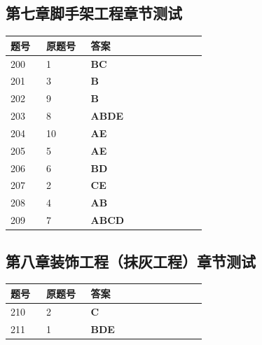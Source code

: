 \documentclass[UTF8,fontset=windows,11pt]{ctexart}
\begin{document}
\subsection*{第七章脚手架工程章节测试}
\begin{longtable}{p{0.16\linewidth}p{0.2\linewidth}p{0.52\linewidth}}
\textbf{\textcolor{examnavy}{题号}} & \textbf{\textcolor{examnavy}{原题号}} & \textbf{\textcolor{answergreen}{答案}} \\
\hline
200 & 1 & \textbf{\textcolor{answergreen}{BC}} \\
201 & 3 & \textbf{\textcolor{answergreen}{B}} \\
202 & 9 & \textbf{\textcolor{answergreen}{B}} \\
203 & 8 & \textbf{\textcolor{answergreen}{ABDE}} \\
204 & 10 & \textbf{\textcolor{answergreen}{AE}} \\
205 & 5 & \textbf{\textcolor{answergreen}{AE}} \\
206 & 6 & \textbf{\textcolor{answergreen}{BD}} \\
207 & 2 & \textbf{\textcolor{answergreen}{CE}} \\
208 & 4 & \textbf{\textcolor{answergreen}{AB}} \\
209 & 7 & \textbf{\textcolor{answergreen}{ABCD}} \\
\end{longtable}
\vspace{0.4em}
\subsection*{第八章装饰工程（抹灰工程）章节测试}
\begin{longtable}{p{0.16\linewidth}p{0.2\linewidth}p{0.52\linewidth}}
\textbf{\textcolor{examnavy}{题号}} & \textbf{\textcolor{examnavy}{原题号}} & \textbf{\textcolor{answergreen}{答案}} \\
\hline
210 & 2 & \textbf{\textcolor{answergreen}{C}} \\
211 & 1 & \textbf{\textcolor{answergreen}{BDE}} \\
\end{longtable}
\vspace{0.4em}
\end{document}
